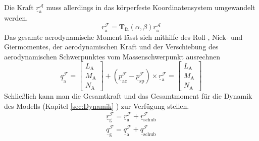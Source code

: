 Die Kraft $\underline{r}^\mathcal{A}_\mathrm{a}$ muss allerdings in das körperfeste Koordinatensystem umgewandelt werden.
\begin{equation}
\underline{r}^\mathcal{F}_\mathrm{a} = \textbf{T}_\mathrm{fa}(\alpha,\beta)\underline{r}^\mathcal{A}_\mathrm{a}
\end{equation}
Das gesamte aerodynamische Moment lässt sich mithilfe des Roll-, Nick- und Giermomentes, der aerodynamischen Kraft und der Verschiebung des aerodynamischen Schwerpunktes vom Massenschwerpunkt ausrechnen
\begin{equation}
\underline{q}^\mathcal{F}_\mathrm{a} = \begin{bmatrix} 
L_\mathrm{A}\\
M_\mathrm{A}\\
N_\mathrm{A}
\end{bmatrix} + (\underline{p}_\mathrm{ac}^\mathcal{F}-\underline{p}_\mathrm{sp}^\mathcal{F})\times\underline{r}^\mathcal{F}_\mathrm{a} = \begin{bmatrix} 
L_\mathrm{A}\\
M_\mathrm{A}\\
N_\mathrm{A}
\end{bmatrix}
\end{equation}
Schlie{\ss}lich kann man die Gesamtkraft und das Gesamtmoment für die Dynamik des Modells (Kapitel \ref{sec:Dynamik} ) zur Verfügung stellen.
\begin{align}
\underline{r}^\mathcal{F}_\mathrm{g} = \underline{r}^\mathcal{F}_\mathrm{a} + \underline{r}^\mathcal{F}_\mathrm{schub}\\
\underline{q}^\mathcal{F}_\mathrm{g} = \underline{q}^\mathcal{F}_\mathrm{a} + \underline{q}^\mathcal{F}_\mathrm{schub}
\end{align}

